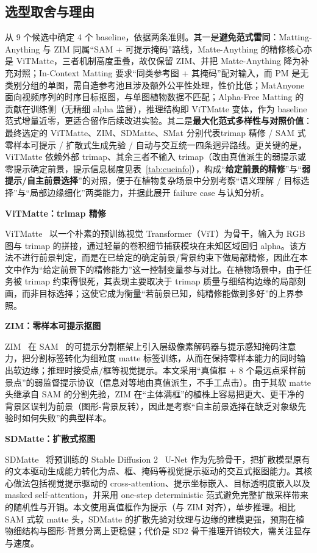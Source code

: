 \documentclass[supercite]{HustGraduPaper}
\begin{document}
	\subsection{选型取舍与理由}
	从 9 个候选中确定 4 个 baseline，依据两条准则。其一是\textbf{避免范式雷同}：Matting-Anything 与 ZIM 同属“SAM + 可提示掩码”路线，Matte-Anything 的精修核心亦是 ViTMatte，三者机制高度重叠，故仅保留 ZIM、并把 Matte-Anything 降为补充对照；In-Context Matting 要求“同类参考图 + 其掩码”配对输入，而 PM 是无类别分组的单图，需自造参考池且涉及额外公平性处理，性价比低；MatAnyone 面向视频序列的时序目标抠图，与单图植物数据不匹配；Alpha-Free Matting 的贡献在训练侧（无精细 alpha 监督），推理结构即 ViTMatte 变体，作为 baseline 范式增量近零，更适合留作后续改进实验。其二是\textbf{最大化范式多样性与对照价值}：最终选定的 ViTMatte、ZIM、SDMatte、SMat 分别代表trimap 精修 / SAM 式零样本可提示 / 扩散式生成先验 / 自动与交互统一四条迥异路线。更关键的是，ViTMatte 依赖外部 trimap、其余三者不输入 trimap（改由真值派生的弱提示或零提示确定前景，提示信息梯度见表~\ref{tab:cueinfo}），构成“\textbf{给定前景的精修}”与“\textbf{弱提示/自主前景选择}”的对照，便于在植物复杂场景中分别考察“语义理解 / 目标选择”与“局部边缘细化”两类能力，并据此展开 failure case 与认知分析。

	\textbf{ViTMatte：trimap 精修}
	
	ViTMatte~\cite{vitmatte} 以一个朴素的预训练视觉 Transformer（ViT）为骨干，输入为 RGB 图与 trimap 的拼接，通过轻量的卷积细节捕获模块在未知区域回归 alpha。该方法不进行前景判定，而是在已给定的确定前景/背景约束下做局部精修，因此在本文中作为“给定前景下的精修能力”这一控制变量参与对比。在植物场景中，由于任务被 trimap 约束得很死，其表现主要取决于 trimap 质量与细结构边缘的局部刻画，而非目标选择；这使它成为衡量“若前景已知，纯精修能做到多好”的上界参照。

	\textbf{ZIM：零样本可提示抠图}
	
	ZIM~\cite{zim} 在 SAM~\cite{sam} 的可提示分割框架上引入层级像素解码器与提示感知掩码注意力，把分割标签转化为细粒度 matte 标签训练，从而在保持零样本能力的同时输出软边缘；推理时接受点/框等视觉提示。本文采用“真值框 + 8 个最远点采样前景点”的弱监督提示协议（信息对等地由真值派生，不手工点击）。由于其软 matte 头继承自 SAM 的分割先验，ZIM 在“主体满框”的植株上容易把更大、更干净的背景区误判为前景（图形-背景反转），因此是考察“自主前景选择在缺乏对象级先验时如何失败”的典型样本。

	\textbf{SDMatte：扩散式抠图}
	
	SDMatte~\cite{sdmatte} 将预训练的 Stable Diffusion 2~\cite{ldm} U-Net 作为先验骨干，把扩散模型原有的文本驱动生成能力转化为点、框、掩码等视觉提示驱动的交互式抠图能力。其核心做法包括视觉提示驱动的 cross-attention、提示坐标嵌入、目标透明度嵌入以及 masked self-attention，并采用 one-step deterministic 范式避免完整扩散采样带来的随机性与开销。本文使用真值框作为提示（与 ZIM 对齐），单步推理。相比 SAM 式软 matte 头，SDMatte 的扩散先验对纹理与边缘的建模更强，预期在植物细结构与图形-背景分离上更稳健；代价是 SD2 骨干推理开销较大，需关注显存与速度。
\end{document}
